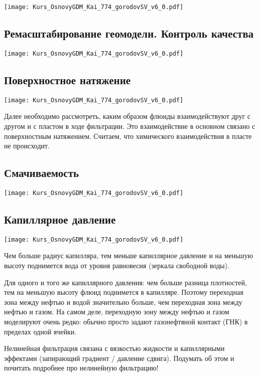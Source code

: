 \documentclass[main.tex]{subfiles}
\begin{document}
\texttt{[image: Kurs\_OsnovyGDM\_Kai\_774\_gorodovSV\_v6\_0.pdf]}

\subsection{Ремасштабирование геомодели. Контроль качества}

\texttt{[image: Kurs\_OsnovyGDM\_Kai\_774\_gorodovSV\_v6\_0.pdf]}

\subsection{Поверхностное натяжение}

\texttt{[image: Kurs\_OsnovyGDM\_Kai\_774\_gorodovSV\_v6\_0.pdf]}

Далее необходимо рассмотреть, каким образом флюиды взаимодействуют друг с другом и с пластом в ходе фильтрации. Это взаимодействие в основном связано с поверхностным натяжением. Считаем, что химического взаимодействия в пласте не происходит.

\subsection{Смачиваемость}

\texttt{[image: Kurs\_OsnovyGDM\_Kai\_774\_gorodovSV\_v6\_0.pdf]}

\subsection{Капиллярное давление}

\texttt{[image: Kurs\_OsnovyGDM\_Kai\_774\_gorodovSV\_v6\_0.pdf]}

Чем больше радиус капилляра, тем меньше капиллярное давление и на меньшую высоту поднимется вода от уровня равновесия (зеркала свободной воды).

Для одного и того же капиллярного давления: чем больше разница плотностей, тем на меньшую высоту флюид поднимется в капилляре.
Поэтому переходная зона между нефтью и водой значительно больше, чем переходная зона между нефтью и газом.
На самом деле, переходную зону между нефтью и газом моделируют очень редко: обычно просто задают газонефтяной контакт (ГНК) в пределах одной ячейки.

Нелинейная фильтрация связана с вязкостью жидкости и капиллярными эффектами (запирающий градиент / давление сдвига). Подумать об этом и почитать подробнее про нелинейную фильтрацию!
\end{document}
